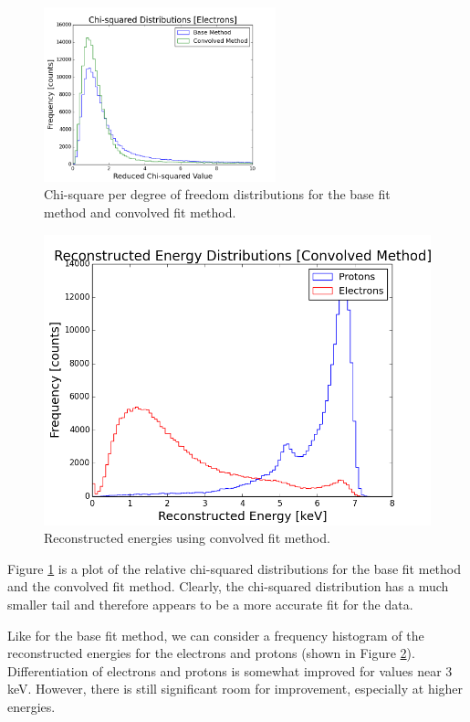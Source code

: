 \begin{figure}[htp!]
    \centering
    \includegraphics[width=0.6\textwidth]{Images2/chiSquareComparison.png}
    \caption{Chi-square per degree of freedom distributions for the base fit method and convolved fit method.}
    \label{fig:relativeChiSquareDistribution}
\end{figure} 
\begin{figure}[htp!]
    \centering
    \includegraphics[scale=0.5]{Images2/convolved.png}
    \caption{Reconstructed energies using convolved fit method.}
    \label{recoEnergyFunc6}
\end{figure}


 Figure \ref{fig:relativeChiSquareDistribution} is a plot of the relative chi-squared distributions for the base fit method and the convolved fit method. Clearly, the chi-squared distribution has a much smaller tail and therefore appears to be a more accurate fit for the data.



Like for the base fit method, we can consider a frequency histogram of the reconstructed energies for the electrons and protons (shown in Figure \ref{recoEnergyFunc6}). Differentiation of electrons and protons is somewhat improved for values near 3 keV. However, there is still significant room for improvement, especially at higher energies. 

